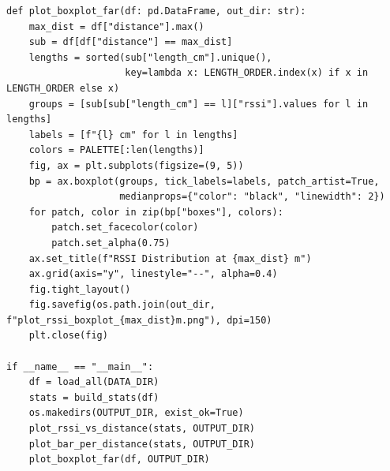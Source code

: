 \begin{lstlisting}[style=appendix-py, caption={Multi-file RSSI plotting (antenna comparison)}, label={lst:rssi-plot}]
def plot_boxplot_far(df: pd.DataFrame, out_dir: str):
    max_dist = df["distance"].max()
    sub = df[df["distance"] == max_dist]
    lengths = sorted(sub["length_cm"].unique(),
                     key=lambda x: LENGTH_ORDER.index(x) if x in LENGTH_ORDER else x)
    groups = [sub[sub["length_cm"] == l]["rssi"].values for l in lengths]
    labels = [f"{l} cm" for l in lengths]
    colors = PALETTE[:len(lengths)]
    fig, ax = plt.subplots(figsize=(9, 5))
    bp = ax.boxplot(groups, tick_labels=labels, patch_artist=True,
                    medianprops={"color": "black", "linewidth": 2})
    for patch, color in zip(bp["boxes"], colors):
        patch.set_facecolor(color)
        patch.set_alpha(0.75)
    ax.set_title(f"RSSI Distribution at {max_dist} m")
    ax.grid(axis="y", linestyle="--", alpha=0.4)
    fig.tight_layout()
    fig.savefig(os.path.join(out_dir, f"plot_rssi_boxplot_{max_dist}m.png"), dpi=150)
    plt.close(fig)

if __name__ == "__main__":
    df = load_all(DATA_DIR)
    stats = build_stats(df)
    os.makedirs(OUTPUT_DIR, exist_ok=True)
    plot_rssi_vs_distance(stats, OUTPUT_DIR)
    plot_bar_per_distance(stats, OUTPUT_DIR)
    plot_boxplot_far(df, OUTPUT_DIR)
\end{lstlisting}

